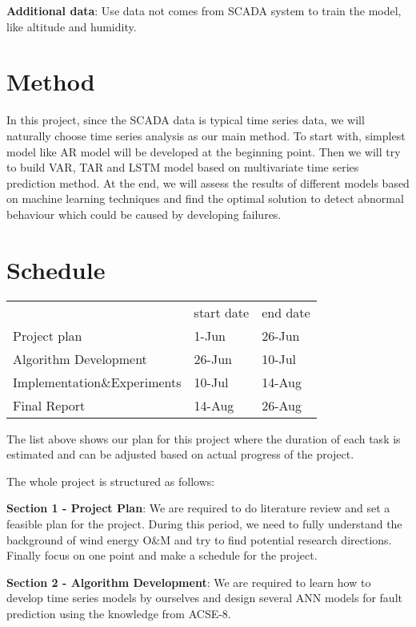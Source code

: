 \documentclass[english,a4paper,11pt]{article}
\begin{document}
\textbf{Additional data}: Use data not comes from SCADA system to train the model, like altitude and humidity.

\section{Method}
In this project, since the SCADA data is typical time series data, we will naturally choose time series analysis as our main method. To start with, simplest model like AR model will be developed at the beginning point. Then we will try to build VAR, TAR and LSTM model based on multivariate time series prediction method. At the end, we will assess the results of different models based on machine learning techniques and find the optimal solution to detect abnormal behaviour which could be caused by developing failures. 

\section{Schedule}

\begin{table}[h]
\begin{tabular}{lll}
                            & start date & end date \\
Project plan                & 1-Jun      & 26-Jun   \\
Algorithm  Development      & 26-Jun     & 10-Jul   \\
Implementation\&Experiments & 10-Jul     & 14-Aug   \\
Final Report                & 14-Aug     & 26-Aug  
\end{tabular}
\end{table}

The list above shows our plan for this project where the duration of each task is estimated and can be adjusted based on actual progress of the project. 

The whole project is structured as follows:

\textbf{Section 1 - Project Plan}: We are required to do literature review and set a feasible plan for the project. During this period, we need to fully understand the background of wind energy O\&M and try to find potential research directions. Finally focus on one point and make a schedule for the project.

\textbf{Section 2 - Algorithm Development}: We are required to learn how to develop time series models by ourselves and design several ANN models for fault prediction using the knowledge from ACSE-8.
\end{document}
